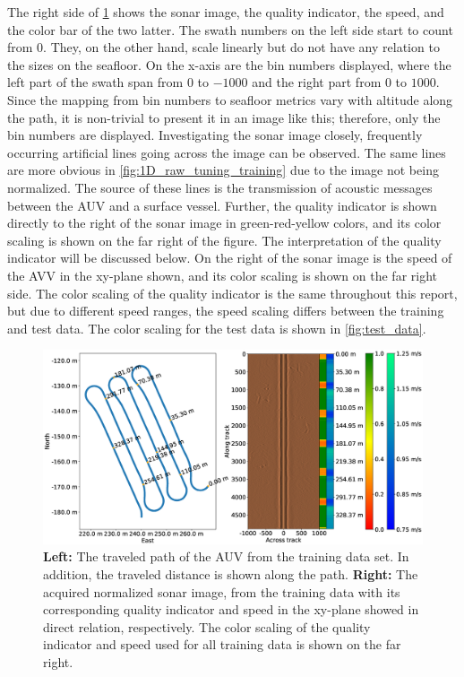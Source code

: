 The right side of \cref{fig:path_sonar_colorbars} shows the sonar image, the quality indicator, the speed, and the color bar of the two latter. The swath numbers on the left side start to count from $0$. They, on the other hand, scale linearly but do not have any relation to the sizes on the seafloor. On the x-axis are the bin numbers displayed, where the left part of the swath span from $0$ to $-1000$ and the right part from $0$ to $1000$. Since the mapping from bin numbers to seafloor metrics vary with altitude along the path, it is non-trivial to present it in an image like this; therefore, only the bin numbers are displayed. Investigating the sonar image closely, frequently occurring artificial lines going across the image can be observed. The same lines are more obvious in \cref{fig:1D_raw_tuning_training} due to the image not being normalized. The source of these lines is the transmission of acoustic messages between the AUV and a surface vessel. Further, the quality indicator is shown directly to the right of the sonar image in green-red-yellow colors, and its color scaling is shown on the far right of the figure. The interpretation of the quality indicator will be discussed below. On the right of the sonar image is the speed of the AVV in the xy-plane shown, and its color scaling is shown on the far right side. The color scaling of the quality indicator is the same throughout this report, but due to different speed ranges, the speed scaling differs between the training and test data. The color scaling for the test data is shown in \cref{fig:test_data}. 

\begin{figure}
    \centering
    \includegraphics[trim=0cm 1.4cm 0cm 3.1cm, clip=true, width=1.0\textwidth]{figures/path_sonar_colorbars_training.eps}
    \caption{\textbf{Left:} The traveled path of the AUV from the training data set. In addition, the traveled distance is shown along the path. \textbf{Right:} The acquired normalized sonar image, from the training data with its corresponding quality indicator and speed in the xy-plane showed in direct relation, respectively. The color scaling of the quality indicator and speed used for all training data is shown on the far right.}
    \label{fig:path_sonar_colorbars}
\end{figure}

